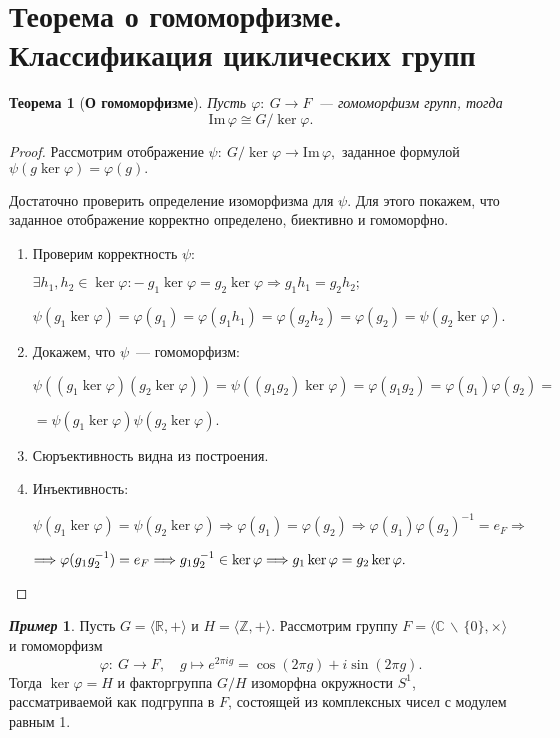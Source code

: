 \documentclass[a4paper, 14pt]{extarticle}
\newcommand{\n}{\par}
\newcommand{\integers}{\mathbb{Z}}
\newcommand{\real}{\mathbb{R}}
\newcommand{\complex}{\mathbb{C}}
\newcommand{\suchthat}{{:}{-} \ }
\newcommand{\im}{\mathrm{Im} \,}
\renewcommand{\phi}{\varphi}
\theoremstyle{definition}
\newtheorem*{exmpl*}{\textit{Пример}}
\theoremstyle{plain}
\newtheorem*{theorem*}{Теорема}
\numberwithin{theorem}{section}
\numberwithin{definition}{section}
\numberwithin{statement}{section}
\numberwithin{lemma}{section}
\numberwithin{consequence}{section}
\begin{document}
	\section{Теорема о гомоморфизме. Классификация циклических групп}
	\begin{theorem*}[\textbf{О гомоморфизме}]
		Пусть ${\phi{:} \ G \rightarrow F}$~--- гомоморфизм групп, тогда
		\begin{equation*}
			\im \phi \cong G/ \ker \phi.
		\end{equation*}
	\end{theorem*}
	\begin{proof}
		Рассмотрим отображение ${\psi{:} \ G/ \ker \phi \rightarrow \im \phi,}$ заданное формулой ${\psi(g \ker \phi) = \phi(g).}$ \n
		Достаточно проверить определение изоморфизма для $\psi.$ Для этого покажем, что заданное отображение корректно определено, биективно и гомоморфно.
		\begin{enumerate}
			\setlength\itemsep{0.1em}
			\item Проверим корректность $\psi{:}$ \n
			$\exists h_1, h_2 \in \ker \phi \suchthat g_1 \ker \phi = g_2 \ker \phi \Longrightarrow g_1 h_1 = g_2 h_2;$ \n
			$\psi(g_1 \ker \phi) = \phi(g_1) = \phi(g_1 h_1) = \phi(g_2 h_2) = \phi(g_2) = \psi(g_2 \ker \phi).$
			\item Докажем, что $\psi$~--- гомоморфизм: \n
			${\psi((g_1 \ker \phi)(g_2 \ker \phi)) = \psi ((g_1g_2) \ker \phi) = \phi(g_1 g_2) = \phi(g_1) \phi(g_2) =}$ \n
			${=\psi(g_1 \ker \phi) \psi(g_2 \ker \phi).}$
			\item Сюръективность видна из построения.
			\item Инъективность: \n
			${\psi(g_1 \ker \phi) = \psi(g_2 \ker \phi) \Longrightarrow \phi(g_1) = \phi(g_2) \Longrightarrow \phi(g_1) \phi(g_2)^{-1} = e_F \Longrightarrow}$ \n $\Longrightarrow \phi(g_1g_2^{-1}) = e_F \Longrightarrow g_1g_2^{-1} \in \ker \phi \Longrightarrow g_1 \ker \phi = g_2 \ker \phi. \qedhere$
		\end{enumerate} 
	\end{proof}
	\begin{exmpl*}
		Пусть ${G = \langle \real, + \rangle}$ и ${H = \langle \integers, + \rangle}$. Рассмотрим группу ${F = \langle \complex \, \backslash \, \{0\}, \times \rangle}$ и гомоморфизм
		\begin{equation*}
			\phi{:} \ G \rightarrow F, \quad g \mapsto e^{2\pi i g} = \cos(2\pi g) + i \sin(2\pi g).
		\end{equation*}
		Тогда ${\ker \phi = H}$ и факторгруппа $G/H$ изоморфна окружности $S^1$, рассматриваемой как подгруппа в $F$, состоящей из комплексных чисел с модулем равным 1.
	\end{exmpl*}
\end{document}
